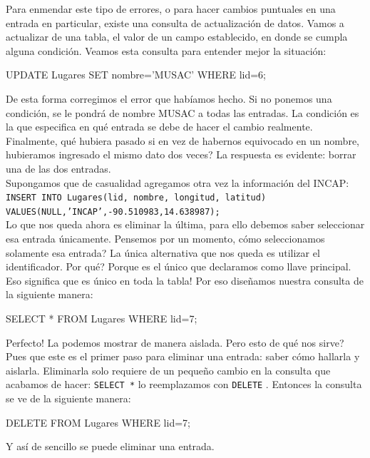 \documentclass[10pt,letterpaper]{article}
\newcommand{\inlinecode}[1]{
\colorbox{light-gray}{\texttt{#1}}
}
\newenvironment{Code}
{
\begin{lrbox}{\selvestebox}%
\begin{minipage}{\dimexpr\columnwidth-2\fboxsep\relax}
\fontfamily{\ttdefault}\selectfont
}
{\end{minipage}\end{lrbox}%
\begin{center}
\colorbox{light-gray}{\usebox{\selvestebox}}
\end{center}
}
\begin{document}
Para enmendar este tipo de errores, o para hacer cambios puntuales en una entrada en particular, existe una consulta de actualizaci\'on de datos. Vamos a actualizar de una tabla, el valor de un campo establecido, en donde se cumpla alguna condici\'on. Veamos esta consulta para entender mejor la situaci\'on:

\begin{Code}
UPDATE Lugares SET nombre='MUSAC' WHERE lid=6;
\end{Code}

De esta forma corregimos el error que hab\'iamos hecho. Si no ponemos una condici\'on, se le pondr\'a de nombre MUSAC a todas las entradas. La condici\'on es la que especifica en qu\'e entrada se debe de hacer el cambio realmente. Finalmente, qu\'e hubiera pasado si en vez de habernos equivocado en un nombre, hubieramos ingresado el mismo dato dos veces? La respuesta es evidente: borrar una de las dos entradas.\\

Supongamos que de casualidad agregamos otra vez la informaci\'on del INCAP:\\ \inlinecode{INSERT INTO Lugares(lid, nombre, longitud, latitud) VALUES(NULL,'INCAP',-90.510983,14.638987);}\\
Lo que nos queda ahora es eliminar la \'ultima, para ello debemos saber seleccionar esa entrada \'unicamente. Pensemos por un momento, c\'omo seleccionamos solamente esa entrada? La \'unica alternativa que nos queda es utilizar el identificador. Por qu\'e? Porque es el \'unico que declaramos como llave principal. Eso significa que es \'unico en toda la tabla! Por eso dise\~namos nuestra consulta de la siguiente manera:

\begin{Code}
SELECT * FROM Lugares WHERE lid=7;
\end{Code}

Perfecto! La podemos mostrar de manera aislada. Pero esto de qu\'e nos sirve? Pues que este es el primer paso para eliminar una entrada: saber c\'omo hallarla y aislarla. Eliminarla solo requiere de un peque\~no cambio en la consulta que acabamos de hacer: \inlinecode{SELECT *} lo reemplazamos con \inlinecode{DELETE}. Entonces la consulta se ve de la siguiente manera:

\begin{Code}
DELETE FROM Lugares WHERE lid=7;
\end{Code}

\noindent Y as\'i de sencillo se puede eliminar una entrada.
\end{document}
